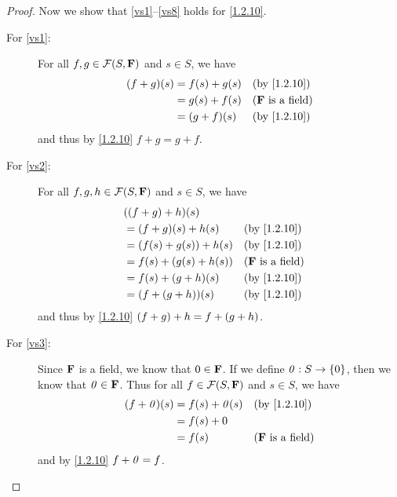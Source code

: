\begin{proof}
    Now we show that \ref{vs1}--\ref{vs8} holds for \cref{1.2.10}.
    \begin{description}
        \item[For \ref{vs1}:]
            For all \(f, g \in \FS\) and \(s \in S\), we have
            \begin{align*}
                \p{f + g}\p{s} & = f\p{s} + g\p{s} &  & \text{(by \cref{1.2.10})}  \\
                               & = g\p{s} + f\p{s} &  & \text{(\(\F\) is a field)} \\
                               & = \p{g + f}\p{s}  &  & \text{(by \cref{1.2.10})}
            \end{align*}
            and thus by \cref{1.2.10} \(f + g = g + f\).
        \item[For \ref{vs2}:]
            For all \(f, g, h \in \FS\) and \(s \in S\), we have
            \begin{align*}
                 & \p{\p{f + g} + h}\p{s}                                         \\
                 & = \p{f + g}\p{s} + h\p{s}      &  & \text{(by \cref{1.2.10})}  \\
                 & = \p{f\p{s} + g\p{s}} + h\p{s} &  & \text{(by \cref{1.2.10})}  \\
                 & = f\p{s} + \p{g\p{s} + h\p{s}} &  & \text{(\(\F\) is a field)} \\
                 & = f\p{s} + \p{g + h}\p{s}      &  & \text{(by \cref{1.2.10})}  \\
                 & = \p{f + \p{g + h}}\p{s}       &  & \text{(by \cref{1.2.10})}
            \end{align*}
            and thus by \cref{1.2.10} \(\left\lparen f + g\right\rparen + h = f + \left\lparen g + h\right\rparen\).
        \item[For \ref{vs3}:]
            Since \(\mathbf{F}\) is a field, we know that \(0 \in \mathbf{F}\).
            If we define \(\mathit{0} : S \to \{0\}\), then we know that \(\mathit{0} \in \mathbf{F}\).
            Thus for all \(f \in \FS\) and \(s \in S\), we have
            \begin{align*}
                \p{f + \zv}\p{s} & = f\p{s} + \zv\p{s} &  & \text{(by \cref{1.2.10})}  \\
                                 & = f\p{s} + 0                                        \\
                                 & = f\p{s}            &  & \text{(\(\F\) is a field)}
            \end{align*}
            and by \cref{1.2.10} \(f + \mathit{0} = f\).

\end{description}
\end{proof}
